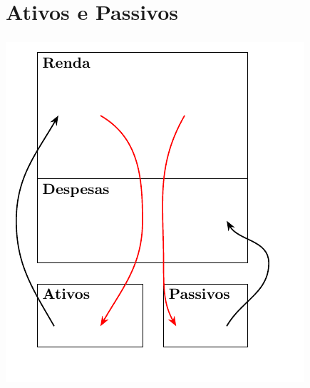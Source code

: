 \section{Ativos e Passivos}

\begin{frame}[c]\frametitle{}
  \begin{center}
    \includegraphics{../figuras/pai_rico}
  \end{center}
\end{frame}